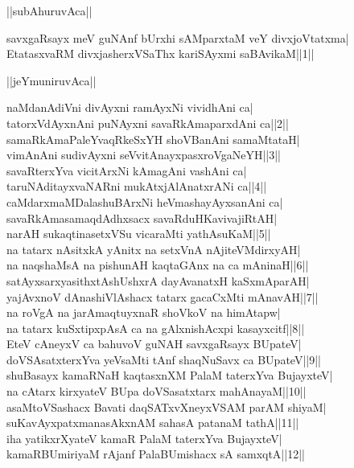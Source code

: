 \documentclass{article}
\begin{document}
\begin{center}
||subAhuruvAca||
\end{center}

savxgaRsayx meV guNAnf bUrxhi sAMparxtaM veY divxjoVtatxma|\\
EtatasxvaRM divxjasherxVSaThx kariSAyxmi saBAvikaM||1||\\

\begin{center}
||jeYmuniruvAca||
\end{center}

naMdanAdiVni divAyxni ramAyxNi vividhAni ca|\\
tatorxVdAyxnAni puNAyxni savaRkAmaparxdAni ca||2||\\
samaRkAmaPaleYvaqRkeSxYH shoVBanAni samaMtataH|\\
vimAnAni sudivAyxni seVvitAnayxpasxroVgaNeYH||3||\\
savaRterxYva vicitArxNi kAmagAni vashAni ca|\\
taruNAditayxvaNARni mukAtxjAlAnatxrANi ca||4||\\
caMdarxmaMDalashuBArxNi heVmashayAyxsanAni ca|\\
savaRkAmasamaqdAdhxsacx savaRduHKavivajiRtAH|\\
narAH sukaqtinasetxVSu vicaraMti yathAsuKaM||5||\\
na tatarx nAsitxkA yAnitx na setxVnA nAjiteVMdirxyAH|\\
na naqshaMsA na pishunAH kaqtaGAnx na ca mAninaH||6||\\
satAyxsarxyasithxtAshUshxrA dayAvanatxH kaSxmAparAH|\\
yajAvxnoV dAnashiVlAshacx tatarx gacaCxMti mAnavAH||7||\\
na roVgA na jarAmaqtuyxnaR shoVkoV na himAtapw|\\
na tatarx kuSxtipxpAsA ca na gAlxnishAcxpi kasayxcitf||8||\\
EteV cAneyxV ca bahuvoV guNAH savxgaRsayx BUpateV|\\
doVSAsatxterxYva yeVsaMti tAnf shaqNuSavx ca BUpateV||9||\\
shuBasayx kamaRNaH kaqtasxnXM PalaM taterxYva BujayxteV|\\
na cAtarx kirxyateV BUpa doVSasatxtarx mahAnayaM||10||\\
asaMtoVSashacx Bavati daqSATxvXneyxVSAM parAM shiyaM|\\
suKavAyxpatxmanasAkxnAM sahasA patanaM tathA||11||\\
iha yatikxrXyateV kamaR PalaM taterxYva BujayxteV|\\
kamaRBUmiriyaM rAjanf PalaBUmishacx sA samxqtA||12||\\
\end{document}
